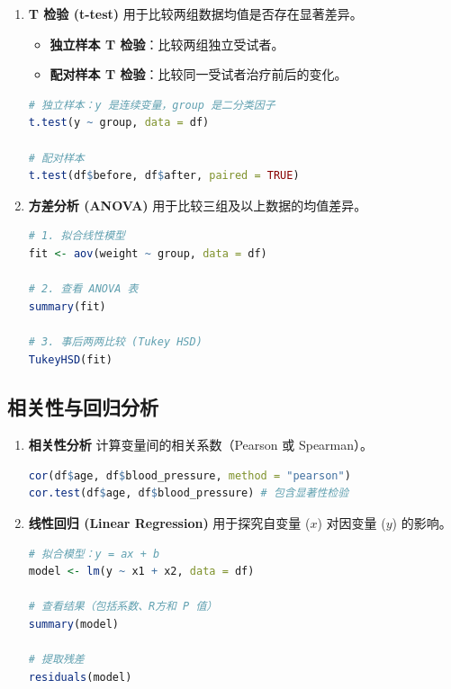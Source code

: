 \begin{enumerate}[label=\arabic*., leftmargin=2em]
    \item \textbf{T 检验 (t-test)}
    用于比较两组数据均值是否存在显著差异。
    \begin{itemize}
        \item \textbf{独立样本 T 检验}：比较两组独立受试者。
        \item \textbf{配对样本 T 检验}：比较同一受试者治疗前后的变化。
    \end{itemize}
\begin{lstlisting}[language=R]
# 独立样本：y 是连续变量，group 是二分类因子
t.test(y ~ group, data = df)

# 配对样本
t.test(df$before, df$after, paired = TRUE)
\end{lstlisting}

    \item \textbf{方差分析 (ANOVA)}
    用于比较三组及以上数据的均值差异。
\begin{lstlisting}[language=R]
# 1. 拟合线性模型
fit <- aov(weight ~ group, data = df)

# 2. 查看 ANOVA 表
summary(fit)

# 3. 事后两两比较 (Tukey HSD)
TukeyHSD(fit)
\end{lstlisting}
\end{enumerate}



\subsection{相关性与回归分析}

\begin{enumerate}[label=\arabic*., leftmargin=2em]
    \item \textbf{相关性分析}
    计算变量间的相关系数（Pearson 或 Spearman）。
\begin{lstlisting}[language=R]
cor(df$age, df$blood_pressure, method = "pearson")
cor.test(df$age, df$blood_pressure) # 包含显著性检验
\end{lstlisting}

    \item \textbf{线性回归 (Linear Regression)}
    用于探究自变量 ($x$) 对因变量 ($y$) 的影响。
\begin{lstlisting}[language=R]
# 拟合模型：y = ax + b
model <- lm(y ~ x1 + x2, data = df)

# 查看结果（包括系数、R方和 P 值）
summary(model)

# 提取残差
residuals(model)
\end{lstlisting}
\end{enumerate}



